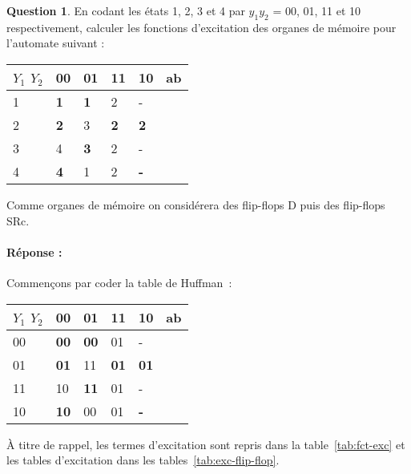 \documentclass[11pt,a4paper]{article}
\theoremstyle{definition}%
\newtheorem{Q}{Question}[] %
\newcommand{\reponse}[1]{%
	\ifthenelse {\boolean{corrige}} {\paragraph{Réponse :} \color{darkblue}   #1\color{black}} {}
 }
\begin{document}
\begin{Q}
	En codant les états 1, 2, 3 et 4 par $y_1y_2$ = 00, 01, 11 et 10 respectivement, calculer les fonctions d'excitation des organes de mémoire pour l'automate suivant :


	\begin{center}
		\begin{tabular}{|l|l|l|l|l|l}
		\hline
		$Y_1$ $Y_2$ & 00         & 01         & 11         & 10         & \multicolumn{1}{l|}{ab} \\ \hline
		1           & \textbf{1} & \textbf{1} & 2          & -          &                         \\ \cline{1-5}
		2           & \textbf{2} & 3          & \textbf{2} & \textbf{2} &                         \\ \cline{1-5}
		3           & 4          & \textbf{3} & 2          & -          &                         \\ \cline{1-5}
		4           & \textbf{4} & 1          & 2          & \textbf{-} &                         \\ \cline{1-5}
		\end{tabular}
	\end{center}
	Comme organes de mémoire on considérera des flip-flops D puis des flip-flops SRc.

	\reponse{
		Commençons par coder la table de Huffman~:
		\begin{center}
			\begin{tabular}{|l|l|l|l|l|l}
			\hline
			$Y_1$ $Y_2$ & 00         & 01         & 11         & 10         & \multicolumn{1}{l|}{ab} \\ \hline
			00           & \textbf{00} & \textbf{00} & 01          & -          &                         \\ \cline{1-5}
			01           & \textbf{01} & 11          & \textbf{01} & \textbf{01} &                         \\ \cline{1-5}
			11           & 10          & \textbf{11} & 01          & -          &                         \\ \cline{1-5}
			10           & \textbf{10} & 00          & 01          & \textbf{-} &                         \\ \cline{1-5}
			\end{tabular}
		\end{center}

		À titre de rappel, les termes d'excitation sont repris dans la table~\ref{tab:fct-exc} et les tables d'excitation dans les tables~\ref{tab:exc-flip-flop}.

}
\end{Q}
\end{document}
